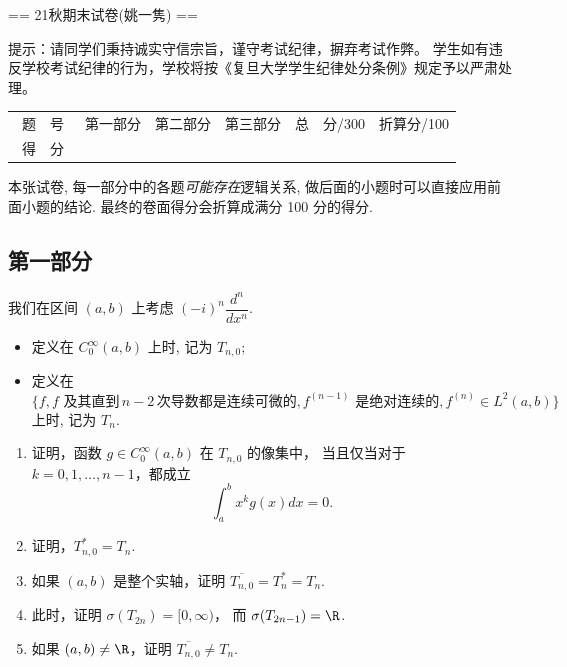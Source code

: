 == 21秋期末试卷(姚一隽) ==
\begin{center}
\end{center}
\begin{center}
\end{center}

\qquad 提示：请同学们秉持诚实守信宗旨，谨守考试纪律，摒弃考试作弊。
学生如有违反学校考试纪律的行为，学校将按《复旦大学学生纪律处分条例》规定予以严肃处理。

\begin{table}
\begin{tabular}{|c|c|c|c|}
\ 题\ \ 号\ & 第一部分 & 第二部分 & 第三部分 & 总\ \ 分/300 & 折算分/100\\
\ 得\ \ 分\ & & & & & 
\end{tabular}
\end{table}

\qquad 本张试卷, 每一部分中的各题\textit{可能存在}逻辑关系, 
做后面的小题时可以直接应用前面小题的结论. 最终的卷面得分会折算成满分 100 分的得分.

\subsection*{第一部分}

我们在区间 $(a, b)$ 上考虑 $(-i)^n \dfrac{d^n}{dx^n}$.

\begin{itemize}
    \item 定义在 $C_0^\infty(a, b)$ 上时, 记为 $T_{n,0}$;
    \item 定义在 \[\{f, f\text{ 及其直到}\,n-2\,{次导数都是连续可微的}, 
    f^{(n-1)} \text{ 是绝对连续的}, f^{(n)} \in L^2(a, b)\}\] 上时, 记为 $T_n$.
\end{itemize}

\begin{enumerate}
    \item 证明，函数 $g \in C_0^\infty(a, b)$ 在 $T_{n,0}$ 的像集中，
    当且仅当对于 $k = 0, 1, \ldots, n - 1$，都成立 
    \[\int_a^b x^k g(x) dx = 0.\]
    \item 证明，$T_{n,0}^* = T_n$.
    \item 如果 $(a, b)$ 是整个实轴，证明 $\overline{T_{n,0}} = T_n^* = T_n$.
    \item 此时，证明 $\sigma(T_{2n}) = [0, \infty)$，
    而 $\sigma(T_{2n-1}) = \R$.
    \item 如果 $(a, b) \neq \R$，证明 $\overline{T_{n,0}} \neq T_n$.
\end{enumerate}

